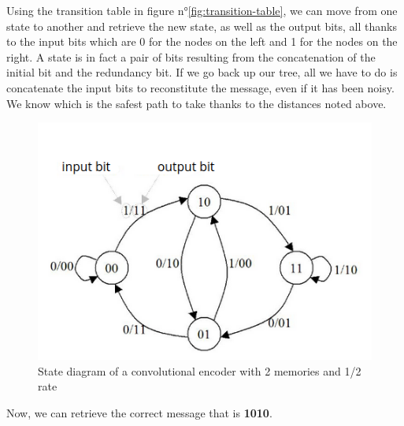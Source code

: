 Using the transition table in figure n°\ref{fig:transition-table}, we can move from one state to another and retrieve the new state, as well as the output bits, all thanks to the input bits which are 0 for the nodes on the left and 1 for the nodes on the right. A state is in fact a pair of bits resulting from the concatenation of the initial bit and the redundancy bit. If we go back up our tree, all we have to do is concatenate the input bits to reconstitute the message, even if it has been noisy. We know which is the safest path to take thanks to the distances noted above.

\begin{figure}[H]
     \centering
     \includegraphics[width=0.5\linewidth]{images/logical_circuit_v2.png}
     \caption{State diagram of a convolutional encoder with 2 memories and 1/2 rate}
     \label{fig:logical_circuit_v2}
\end{figure}

Now, we can retrieve the correct message that is \textbf{1010}.

\newpage